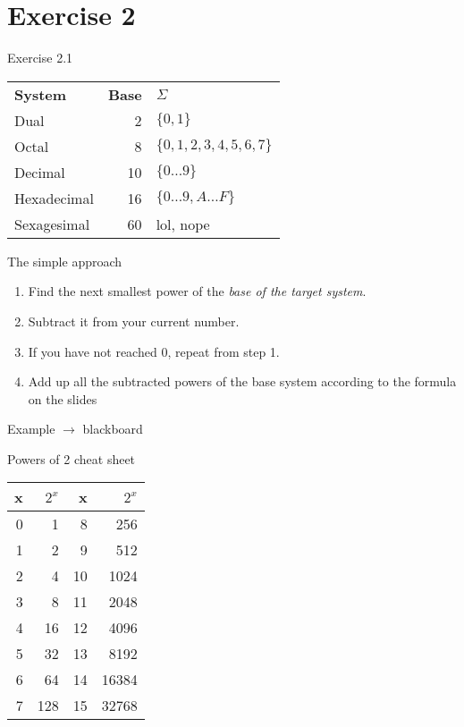 \documentclass[11pt]{tudbeamer}
\begin{document}
\section{Exercise 2}

\begin{frame}[allowframebreaks]{Exercise 2.1}

	\begin{tabular}{lrl}
		\textbf{System} & \textbf{Base} & $\Sigma$ \\
		Dual & 2 			& $\lbrace 0,1 \rbrace$\\
		Octal & 8 			& $\lbrace 0,1,2,3,4,5,6,7 \rbrace$\\
		Decimal & 10 		& $\lbrace 0\dots9 \rbrace$\\
		Hexadecimal & 16 	& $\lbrace 0 \dots 9, A \dots F \rbrace$\\
		Sexagesimal & 60 	& lol, nope \\
	\end{tabular}

\framebreak

	\begin{block}{The simple approach}
		\begin{enumerate}
			\item Find the next smallest power of the \textit{base of the target system}.
			\item Subtract it from your current number.
			\item If you have not reached 0, repeat from step 1.
			\item Add up all the subtracted powers of the base system according to the formula on the slides
		\end{enumerate}
	\end{block}
	
	Example $\rightarrow$ blackboard

\framebreak
\centering

	Powers of 2 cheat sheet
	\vspace{1em}
	
	\begin{tabular}{rr|rr}
	x & $2^x$ & x & $2^x$ \\
	\hline
	0 & 1 & 		8 & 256 \\
	1 & 2 & 		9 & 512 \\
	2 & 4 & 		10 & 1024 \\
	3 & 8 &  	11 & 2048 \\
	4 & 16 & 	12 & 4096 \\
	5 & 32 & 	13 & 8192 \\
	6 & 64 &  	14 & 16384\\
	7 & 128 &	15 & 32768 \\
	\end{tabular}


\end{frame}
\end{document}
